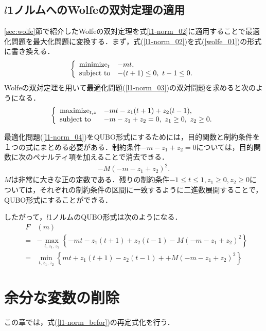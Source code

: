 \documentclass[technicalreport]{ieicej}
\begin{document}
\subsection{$l$1ノルムへのWolfeの双対定理の適用}
\ref{sec:wolfe}節で紹介したWolfeの双対定理を式\ref{l1-norm_02}に適用することで最適化問題を最大化問題に変換する．まず，式(\ref{l1-norm_02})を式(\ref{wolfe_01})の形式に書き換える．
\begin{equation}
  \left\{
  \begin{array}{ll}
    $minimize$_{t} & -mt, \\
    $subject to$ & -(t+1)\leq 0,\ t-1\leq 0. \label{l1-norm_03}
  \end{array}
  \right.
\end{equation}
Wolfeの双対定理を用いて最適化問題(\ref{l1-norm_03})の双対問題を求めると次のようになる．
\begin{equation}
  \left\{
  \begin{array}{ll}
    $maximize$_{t,z} & -mt-z_{1}(t+1)+z_{2}(t-1), \\
    $subject to$ & -m-z_{1}+z_{2}=0,\ z_{1}\geq 0,\ z_{2}\geq 0. \label{l1-norm_04}
  \end{array}
  \right.
\end{equation}

最適化問題(\ref{l1-norm_04})をQUBO形式にするためには，目的関数と制約条件を１つの式にまとめる必要がある．制約条件$-m-z_{1}+z_{2}=0$については，目的関数に次のペナルティ項を加えることで消去できる．
\begin{eqnarray}
  -M(-m-z_{1}+z_{2})^{2}. \label{penalty}
\end{eqnarray}
$M$は非常に大きな正の定数である．残りの制約条件$-1\leq t\leq 1,z_{1}\geq 0,z_{2}\geq 0$については，それぞれの制約条件の区間に一致するように二進数展開することで，QUBO形式にすることができる．

したがって，$l$1ノルムのQUBO形式は次のようになる．
\begin{eqnarray}
  &F&(m) \nonumber \\
  &=& -\max_{t,z_{1},z_{2}}{\left\{-mt-z_{1}(t+1)+z_{2}(t-1)-M(-m-z_{1}+z_{2})^{2}\right\}} \nonumber \\
  &=& \min_{t,z_{1},z_{2}}{\left\{mt+z_{1}(t+1)-z_{2}(t-1)++M(-m-z_{1}+z_{2})^{2}\right\}} \label{l1-norm_befor}
\end{eqnarray}

\section{余分な変数の削除}
この章では，式(\ref{l1-norm_befor})の再定式化を行う．
\end{document}
